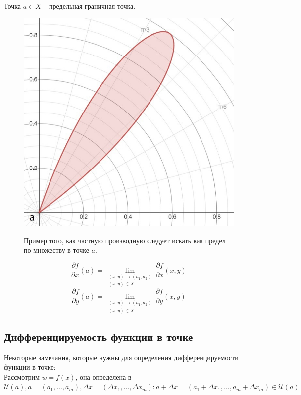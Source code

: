 \documentclass[a4paper,12pt]{article} %
\begin{document}
Точка $a \in X$ -- предельная граничная точка. 
\begin{figure}[h!]
	\centering
	\includegraphics[scale=0.44]{Primer_1.jpg}
	\label{fig:universe}
	\caption{Пример того, как частную производную следует искать как предел по множеству в точке $a$.}
\end{figure}
\[\frac{\partial f}{\partial x}(a) = \lim\limits_{\substack{(x, y)\to (a_1, a_2)\\(x, y) \in X}} \frac{\partial f} {\partial x}(x, y)\]
\[\frac{\partial f}{\partial y}(a) = \lim\limits_{\substack{(x, y)\to (a_1, a_2)\\(x, y) \in X}} \frac{\partial f} {\partial y}(x, y)\]

\subsection{Дифференцируемость функции в точке}
	
Некоторые замечания, которые нужны для определения дифференцируемости функции в точке:\\

Рассмотрим $w = f(x)$, она определена в $\mathscr{U}(a), a = (a_1, \ldots,a_m), \Delta x = (\Delta x_1, \ldots, \Delta x_m): a + \Delta x = (a_1 + \Delta x_1, \ldots , a_m + \Delta x_m) \in \mathscr{U}(a)$\\
\end{document}
